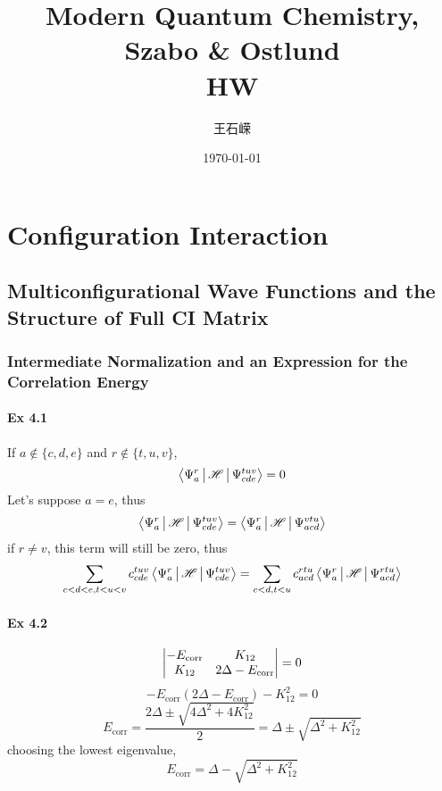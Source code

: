 \documentclass[a4paper]{article}
\title{\textbf{Modern Quantum Chemistry, Szabo \& Ostlund}\\HW}
\author{王石嵘
\vspace{5pt}\\
}
\date{\today} %
\DeclareMathOperator{\corr}{\mathrm{corr}}
\newcommand{\ex}[1]{\paragraph{Ex #1}}
\numberwithin{equation}{subsection}
\begin{document}

\maketitle

\tableofcontents

\newpage

\setcounter{section}{3}
\section{Configuration Interaction}
\subsection{Multiconfigurational Wave Functions and the Structure of Full CI Matrix}

\subsubsection{Intermediate Normalization and an Expression for the Correlation Energy}
\ex{4.1}
If $ a\notin \{c,d,e\} $ and $ r\notin\{t,u,v\} $,
\begin{equation}\label{key}
\Braket{\Psi_a^r | \mathscr{H} | \Psi_{cde}^{tuv}} = 0
\end{equation}
Let's suppose $ a = e $, thus
\begin{equation}\label{key}
\Braket{\Psi_a^r | \mathscr{H} | \Psi_{cde}^{tuv}} = \Braket{\Psi_a^r | \mathscr{H} | \Psi_{acd}^{vtu}} 
\end{equation}
if $ r\neq v $, this term will still be zero, thus
\begin{equation}\label{key}
\sum_{c<d<e,t<u<v} c_{cde}^{tuv} \Braket{\Psi_a^r | \mathscr{H} | \Psi_{cde}^{tuv}} = \sum_{c<d,t<u} c_{acd}^{rtu} \Braket{\Psi_a^r | \mathscr{H} | \Psi_{acd}^{rtu}} 
\end{equation}

\ex{4.2}
\begin{equation}\label{key}
\mqty|-E_{\corr} & K_{12}\\ K_{12} & 2\Delta-E_{\corr}| = 0
\end{equation}
\begin{equation}\label{key}
-E_{\corr}(2\Delta-E_{\corr}) - K_{12}^2 = 0
\end{equation}
\begin{equation}\label{key}
E_{\corr} = \dfrac{2\Delta \pm \sqrt{4\Delta^2 + 4K_{12}^2}}{2} = \Delta \pm \sqrt{\Delta^2 + K_{12}^2}
\end{equation}
choosing the lowest eigenvalue,
\begin{equation}\label{key}
E_{\corr} = \Delta - \sqrt{\Delta^2 + K_{12}^2}
\end{equation}
\end{document}
